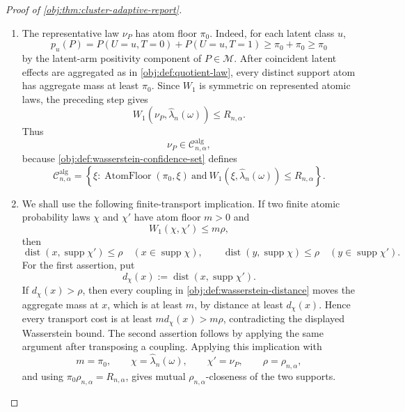 \documentclass[11pt]{article}
\begin{document}
\begin{proof}[Proof of \cref{obj:thm:cluster-adaptive-report}]
\begin{enumerate}
\item The representative law \(\nu_P\) has atom floor \(\pi_0\).  Indeed, for
each latent class \(u\),
\[
p_u(P)=P(U=u,T=0)+P(U=u,T=1)\ge \pi_0+\pi_0\ge\pi_0
\]
by the latent-arm positivity component of \(P\in\mathcal M\).  After coincident
latent effects are aggregated as in \cref{obj:def:quotient-law}, every distinct
support atom has aggregate mass at least \(\pi_0\).  Since \(W_1\) is symmetric
on represented atomic laws, the preceding step gives
\[
W_1(\nu_P,\widehat\lambda_n(\omega))\le R_{n,\alpha}.
\]
Thus
\[
\nu_P\in\mathcal C^{\mathrm{alg}}_{n,\alpha},
\]
because \cref{obj:def:wasserstein-confidence-set} defines
\[
\mathcal C^{\mathrm{alg}}_{n,\alpha}
=
\left\{
\xi:
\operatorname{AtomFloor}(\pi_0,\xi)
\ \text{and}\
W_1(\xi,\widehat\lambda_n(\omega))\le R_{n,\alpha}
\right\}. %
\]

\item We shall use the following finite-transport implication.  If two finite
atomic probability laws \(\chi\) and \(\chi'\) have atom floor \(m>0\) and
\[
W_1(\chi,\chi')\le m\rho ,
\]
then
\[
\operatorname{dist}(x,\operatorname{supp}\chi')\le\rho
\quad(x\in\operatorname{supp}\chi),
\qquad
\operatorname{dist}(y,\operatorname{supp}\chi)\le\rho
\quad(y\in\operatorname{supp}\chi').
\]
For the first assertion, put
\[
d_\chi(x):=\operatorname{dist}(x,\operatorname{supp}\chi').
\]
If \(d_\chi(x)>\rho\), then every coupling in
\cref{obj:def:wasserstein-distance} moves the aggregate mass at \(x\), which is
at least \(m\), by distance at least \(d_\chi(x)\).  Hence every transport cost
is at least \(m d_\chi(x)>m\rho\), contradicting the displayed Wasserstein
bound.  The second assertion follows by applying the same argument after
transposing a coupling.  Applying this implication with
\[
m=\pi_0,\qquad
\chi=\widehat\lambda_n(\omega),\qquad
\chi'=\nu_P,\qquad
\rho=\rho_{n,\alpha},
\]
and using \(\pi_0\rho_{n,\alpha}=R_{n,\alpha}\), gives mutual
\(\rho_{n,\alpha}\)-closeness of the two supports. %


\end{enumerate}
\end{proof}
\end{document}
